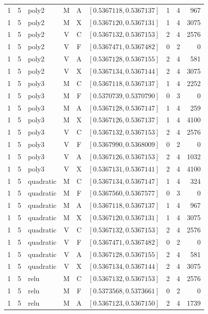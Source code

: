\begin{longtable}{r r l c c l r r r}
1 & 5 & poly2 & M & A & $[0.5367118,0.5367137]$ & 1 & 4 & 967 \\
1 & 5 & poly2 & M & X & $[0.5367120,0.5367131]$ & 1 & 4 & 3075 \\
1 & 5 & poly2 & V & C & $[0.5367132,0.5367153]$ & 2 & 4 & 2576 \\
1 & 5 & poly2 & V & F & $[0.5367471,0.5367482]$ & 0 & 2 & 0 \\
1 & 5 & poly2 & V & A & $[0.5367128,0.5367155]$ & 2 & 4 & 581 \\
1 & 5 & poly2 & V & X & $[0.5367134,0.5367144]$ & 2 & 4 & 3075 \\
1 & 5 & poly3 & M & C & $[0.5367118,0.5367137]$ & 1 & 4 & 2252 \\
1 & 5 & poly3 & M & F & $[0.5370739,0.5370790]$ & 0 & 3 & 0 \\
1 & 5 & poly3 & M & A & $[0.5367128,0.5367147]$ & 1 & 4 & 259 \\
1 & 5 & poly3 & M & X & $[0.5367126,0.5367137]$ & 1 & 4 & 4100 \\
1 & 5 & poly3 & V & C & $[0.5367132,0.5367153]$ & 2 & 4 & 2576 \\
1 & 5 & poly3 & V & F & $[0.5367990,0.5368009]$ & 0 & 2 & 0 \\
1 & 5 & poly3 & V & A & $[0.5367126,0.5367153]$ & 2 & 4 & 1032 \\
1 & 5 & poly3 & V & X & $[0.5367131,0.5367141]$ & 2 & 4 & 4100 \\
1 & 5 & quadratic & M & C & $[0.5367134,0.5367147]$ & 1 & 4 & 324 \\
1 & 5 & quadratic & M & F & $[0.5367560,0.5367577]$ & 0 & 3 & 0 \\
1 & 5 & quadratic & M & A & $[0.5367118,0.5367137]$ & 1 & 4 & 967 \\
1 & 5 & quadratic & M & X & $[0.5367120,0.5367131]$ & 1 & 4 & 3075 \\
1 & 5 & quadratic & V & C & $[0.5367132,0.5367153]$ & 2 & 4 & 2576 \\
1 & 5 & quadratic & V & F & $[0.5367471,0.5367482]$ & 0 & 2 & 0 \\
1 & 5 & quadratic & V & A & $[0.5367128,0.5367155]$ & 2 & 4 & 581 \\
1 & 5 & quadratic & V & X & $[0.5367134,0.5367144]$ & 2 & 4 & 3075 \\
1 & 5 & relu & M & C & $[0.5367132,0.5367153]$ & 2 & 4 & 2576 \\
1 & 5 & relu & M & F & $[0.5373568,0.5373661]$ & 0 & 2 & 0 \\
1 & 5 & relu & M & A & $[0.5367123,0.5367150]$ & 2 & 4 & 1739 \\

\end{longtable}
